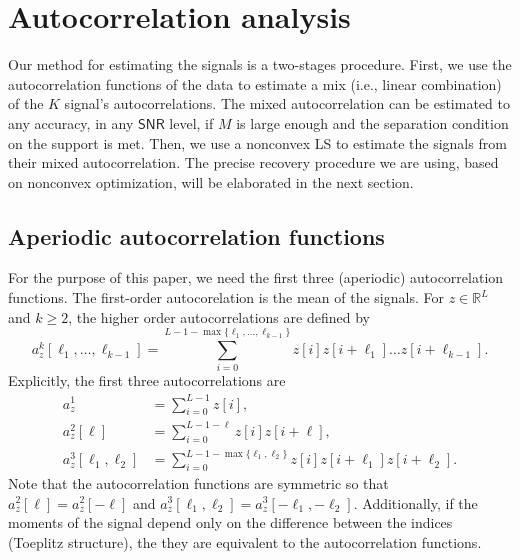 \documentclass[english,11pt]{article}
\numberwithin{equation}{section}
\theoremstyle{plain}
\theoremstyle{definition}
\theoremstyle{remark}
\theoremstyle{plain}
\theoremstyle{remark}
\theoremstyle{plain}
\theoremstyle{plain}
\newcommand{\RL}{\mathbb{R}^L}
\newcommand{\SNR}{{\textsf{SNR}}}
\begin{document}
\section{Autocorrelation analysis}   \label{sec:autocorrelation}

Our method for estimating the signals is a two-stages procedure. 
First, we use the autocorrelation functions of the data to estimate a mix (i.e., linear combination) of the $K$ signal's autocorrelations. The mixed autocorrelation can be estimated to any accuracy, in any $\SNR$ level, if $M$ is large enough and the separation condition on the support is met. Then, we  use a nonconvex LS  to estimate the signals from their mixed autocorrelation. 
The precise recovery procedure we are using, based on nonconvex optimization, will be elaborated in the next section.


\subsection{Aperiodic autocorrelation functions} \label{sec:aperiodic_ac}

For the purpose of this paper, we need the first three (aperiodic) autocorrelation functions. The first-order autocorelation is the mean of the signals. For  
$z\in\RL$ and $k\geq 2$, the higher order autocorrelations are defined by
\begin{equation*}
a_z^k[\ell_1,\ldots,\ell_{k-1}] =  \sum_{i=0}^{L-1-\max\{\ell_1,\ldots,\ell_{k-1}\}} z[i]z[i+\ell_1]\ldots z[i+\ell_{k-1}].
\end{equation*}
Explicitly, the first three autocorrelations are
\begin{align} \label{eq:autocorrelations}
a_z^1 &= \sum_{i=0}^{L-1} z[i], \nonumber\\
a_z^2[\ell] &= \sum_{i=0}^{L-1-\ell} z[i]z[i+\ell], \nonumber\\
a_z^3[\ell_1,\ell_2] &= \sum_{i=0}^{L-1-\max\{\ell_1,\ell_2\}} z[i]z[i+\ell_1]z[i+\ell_2]. 
\end{align}
Note that the autocorrelation functions are symmetric so that $a_z^2[\ell] = a_z^2[-\ell]$ and $a_z^3[\ell_1,\ell_2] = a_z^3[-\ell_1,-\ell_2]$. 
Additionally, if the moments of the signal depend only on the difference between the indices (Toeplitz structure), the they are equivalent to the autocorrelation functions.
\end{document}
